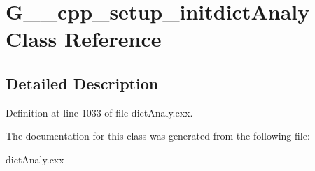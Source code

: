 \hypertarget{classG____cpp__setup__initdictAnaly}{
\section{G\_\-\_\-cpp\_\-setup\_\-initdictAnaly Class Reference}
\label{classG____cpp__setup__initdictAnaly}
}


\subsection{Detailed Description}


Definition at line 1033 of file dictAnaly.cxx.



The documentation for this class was generated from the following file:\begin{DoxyCompactItemize}
\item 
dictAnaly.cxx\end{DoxyCompactItemize}
